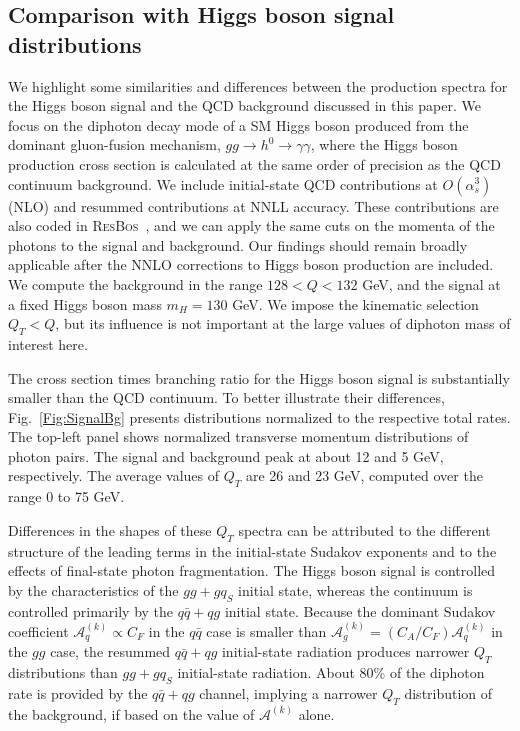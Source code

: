 \documentclass[12pt,english,aps,preprint,prd,letterpaper,fleqn,nofootinbib,showpacs,showkeys,tightenlines,floatfix]{revtex4}
\begin{document}
{\begin{figure*}
\caption{Comparison of the normalized Higgs boson signal and diphoton background
distributions at the LHC, both computed at NNLL accuracy. The Higgs
boson mass is taken to be $m_{H}=130$ GeV, and the background is
calculated for $128<Q<132$ GeV.}

\label{Fig:SignalBg} 
\end{figure*}



\subsection{Comparison with Higgs boson signal distributions}

We highlight some similarities and differences between the production
spectra for the Higgs boson signal and the QCD background discussed
in this paper. We focus on the diphoton decay mode of a SM Higgs boson
produced from the dominant gluon-fusion mechanism, $gg\rightarrow h^{0}\rightarrow\gamma\gamma$,
where the Higgs boson production cross section is calculated at the
same order of precision as the QCD continuum background. We include
initial-state QCD contributions at $O(\alpha_{s}^{3})$ (NLO) and
resummed contributions at NNLL accuracy. These contributions are also
coded in \textsc{ResBos}~\cite{Balazs:2000wv}, and we can apply
the same cuts on the momenta of the photons to the signal and background.
Our findings should remain broadly applicable after the NNLO corrections to
Higgs boson production \cite{Catani:2003zt,Bozzi:2005wk} are included.
We compute the background in the range $128<Q<132$ GeV, and the signal
at a fixed Higgs boson mass $m_{H}=130$ GeV. We impose the kinematic
selection $Q_{T}<Q$, but its influence is not important at the large
values of diphoton mass of interest here. 

The cross section times branching ratio for the Higgs boson signal
is substantially smaller than the QCD continuum. To better illustrate
their differences, Fig.~\ref{Fig:SignalBg} presents distributions
normalized to the respective total rates. The top-left panel shows
normalized transverse momentum distributions of photon pairs. The
signal and background peak at about 12 and 5 GeV, respectively. The
average values of $Q_{T}$ are 26 and 23 GeV, computed over the range
0 to 75 GeV.

Differences in the shapes of these $Q_{T}$ spectra can be attributed
to the different structure of the leading terms in the initial-state
Sudakov exponents and to the effects of final-state photon fragmentation.
The Higgs boson signal is controlled by the characteristics of the
$gg+gq_{S}$ initial state, whereas the continuum is controlled primarily
by the $q\bar{q}+qg$ initial state. Because the dominant Sudakov
coefficient $\mathcal{A}_{q}^{(k)} \propto C_{F}$ in the $q\bar{q}$ case
is smaller than $\mathcal{A}_{g}^{(k)}= (C_{A}/C_{F})\mathcal{A}_{q}^{(k)}$ 
in the $gg$ case,
the resummed $q\bar{q}+qg$ initial-state radiation produces narrower
$Q_{T}$ distributions than $gg+gq_{S}$ initial-state radiation.
About 80\% of the diphoton rate is provided by the $q\bar{q}+qg$
channel, implying a narrower $Q_{T}$ distribution of the background,
if based on the value of $\mathcal{A}^{(k)}$ alone.

}
\end{document}
